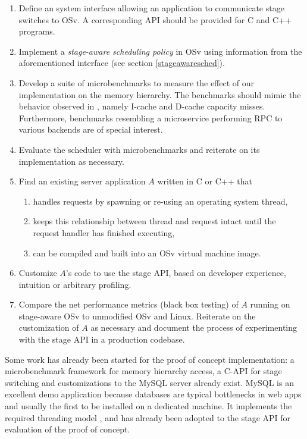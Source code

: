 \documentclass{article}
\begin{document}
\begin{enumerate}
    \item \label{stageapi} Define an system interface allowing an application to communicate stage switches to OSv.
            A corresponding API should be provided for C and C++ programs.
    \item \label{schedpolicy} Implement a \textit{stage-aware scheduling policy} in OSv
            using information from the aforementioned interface (see section \ref{stageawaresched}).
    \item \label{microbench} Develop a suite of microbenchmarks to measure the effect of our implementation on the memory hierarchy.
        The benchmarks should mimic the behavior observed in \cite{kanev2015profiling}, namely I-cache and D-cache capacity misses.
        Furthermore, benchmarks resembling a microservice performing RPC to various backends are of special interest.
    \item Evaluate the scheduler with microbenchmarks and reiterate on its implementation as necessary.
    \item \label{appdesign} Find an existing server application $A$ written in C or C++ that
    \begin{enumerate}
        \item handles requests by spawning or re-using an operating system thread,
        \item keeps this relationship between thread and request intact until the request handler has finished executing,
        \item \label{app_osv_image} can be compiled and built into an OSv virtual machine image.
    \end{enumerate}
    \item Customize $A$'s code to use the stage API, based on developer experience, intuition or arbitrary profiling.
    \item Compare the net performance metrics (black box testing) of $A$ running on stage-aware OSv to unmodified OSv and Linux.
        Reiterate on the customization of $A$ as necessary and document the process of experimenting with the stage API in a production codebase.
\end{enumerate}

Some work has already been started for the proof of concept implementation:
a microbenchmark framework for memory hierarchy access, a C-API for stage switching and customizations to the MySQL
server already exist.
MySQL is an excellent demo application because databases are typical bottlenecks in web apps and usually the
first to be installed on a dedicated machine. It implements the required threading model \cite{mysqlThreading},
and has already been adopted to the stage API for evaluation of the proof of concept.
\end{document}
